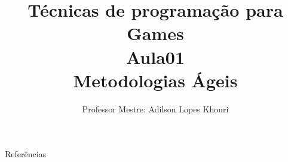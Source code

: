 \documentclass[compress, hyperref={pdfpagelayout=SinglePage}]{beamer}
\title[AED - Aula 01]{Técnicas de programação para Games \\ Aula01 \\ Metodologias Ágeis}
\author{Professor Mestre: Adilson Lopes Khouri}
\begin{document}
	\begin{frame}
		\titlepage
	\end{frame}

	
	
	
	
	
	
	
		
	
		
	
		
	
		
		
	

	


	\begin{frame}{}
		\begin{block}{Referências}
			\nocite{*}
			
	    		
		\end{block}
	\end{frame}
\end{document}
